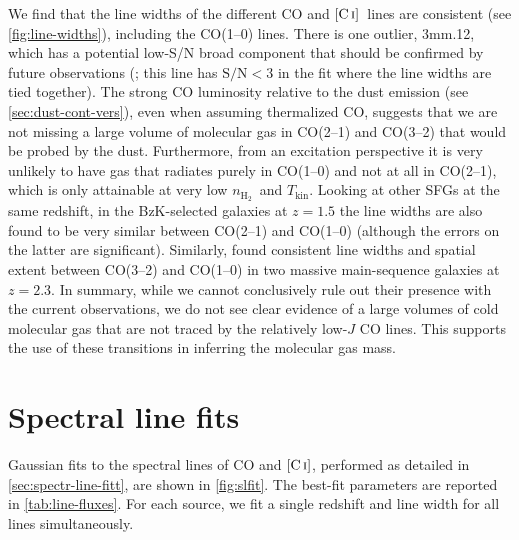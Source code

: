\documentclass[twocolumn]{aastex62}
\newcommand{\HH}{\ensuremath{\mathrm{H}_{2}}}
\newcommand{\Tkin}{\ensuremath{T_{\mathrm{kin}}}}
\newcommand{\nHH}{\ensuremath{n_{\HH}}}
\newcommand{\CI}{\ensuremath{\mathrm{[C\, \textsc{i}]}}}
\begin{document}
We find that the line widths of the different CO and \CI\ lines are consistent
(see \autoref{fig:line-widths}), including the CO(1--0) lines.  There is one
outlier, 3mm.12, which has a potential low-S/N broad component that should be
confirmed by future observations (\citealt{Riechers2020b}; this line has
$\mathrm{S/N}<3$ in the fit where the line widths are tied together).  The
strong CO luminosity relative to the dust emission (see
\autoref{sec:dust-cont-vers}), even when assuming thermalized CO, suggests that
we are not missing a large volume of molecular gas in CO(2--1) and CO(3--2)
that would be probed by the dust.  Furthermore, from an excitation perspective
it is very unlikely to have gas that radiates purely in CO(1--0) and not at all
in CO(2--1), which is only attainable at very low \nHH\ and \Tkin.  Looking at
other SFGs at the same redshift, in the BzK-selected galaxies at $z=1.5$
\citep{Daddi2015} the line widths are also found to be very similar between
CO(2--1) \citep{Daddi2010} and CO(1--0) \citep{Aravena2014} (although the
errors on the latter are significant).  Similarly, \cite{Bolatto2015} found
consistent line widths and spatial extent between CO(3--2) and CO(1--0) in two
massive main-sequence galaxies at $z=2.3$.  In summary, while we cannot
conclusively rule out their presence with the current observations, we do not
see clear evidence of a large volumes of cold molecular gas that are not traced
by the relatively low-$J$ CO lines.  This supports the use of these transitions
in inferring the molecular gas mass.

\section{Spectral line fits}
\label{sec:spectral-line-fits}
Gaussian fits to the spectral lines of CO and \CI, performed as detailed in
\autoref{sec:spectr-line-fitt}, are shown in \autoref{fig:slfit}.  The best-fit
parameters are reported in \autoref{tab:line-fluxes}.  For each source, we fit
a single redshift and line width for all lines simultaneously.
\end{document}
